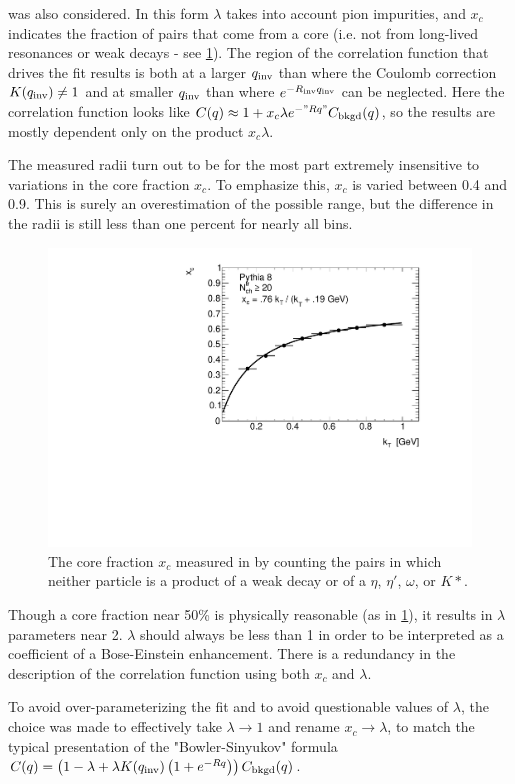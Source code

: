 was also considered.
In this form $\lambda$ takes into account pion impurities, and $x_c$ indicates the fraction of pairs that come from a core (i.e. not from long-lived resonances or weak decays - see \cref{fig:pythia_xc}).
The region of the correlation function that drives the fit results is both at a larger $q_{\mathrm{inv}}$ than where the Coulomb correction $K(q_{\mathrm{inv}}) \neq 1$ and at smaller $q_{\mathrm{inv}}$ than where $e^{-R_{\mathrm{inv}}q_{\mathrm{inv}}}$ can be neglected.
Here the correlation function looks like $C(q) \approx 1 + x_c \lambda e^{-"Rq"} C_{\textrm{bkgd}}(q)$, so the results are mostly dependent only on the product $x_c \lambda$.

The measured radii turn out to be for the most part extremely insensitive to variations in the core fraction $x_c$.
To emphasize this, $x_c$ is varied between 0.4 and 0.9.
This is surely an overestimation of the possible range, but the difference in the radii is still less than one percent for nearly all bins.

\begin{figure}[t]
\begin{minipage}[t]{1.0\textwidth}
\centering
\includegraphics[width=.49\linewidth]{pythia_xc.pdf}
\end{minipage}
\caption{The core fraction $x_c$ measured in \PYEight by counting the pairs in which neither particle is a product of a weak decay or of a $\eta$, $\eta'$, $\omega$, or $K*$.}
\label{fig:pythia_xc}
\end{figure}

Though a core fraction near 50\% is physically reasonable (as in \cref{fig:pythia_xc}), it results in $\lambda$ parameters near 2.
$\lambda$ should always be less than 1 in order to be interpreted as a coefficient of a Bose-Einstein enhancement.
There is a redundancy in the description of the correlation function using both $x_c$ and $\lambda$.

To avoid over-parameterizing the fit and to avoid questionable values of $\lambda$, the choice was made to effectively take $\lambda \rightarrow 1$ and rename $x_c \rightarrow \lambda$, to match the typical presentation of the "Bowler-Sinyukov" formula $C(q) = \left( 1-\lambda + \lambda K(q_{\mathrm{inv}})\left( 1 + e^{-Rq} \right)\right) C_{\textrm{bkgd}}(q)$.

